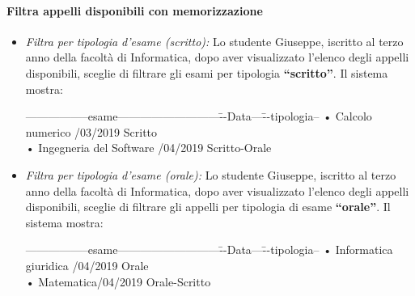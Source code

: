 \paragraph{Filtra appelli disponibili con memorizzazione}
\begin{itemize}
	\item \textit{Filtra per tipologia d’esame (scritto):}
	Lo studente Giuseppe, iscritto al terzo anno della facoltà di Informatica, dopo aver visualizzato l’elenco degli appelli disponibili, sceglie di filtrare gli esami per tipologia \textbf{“scritto”}. Il sistema mostra:  
	\begin{tabbing}
		\hspace{1cm}-----------------esame---------------------------\=--Data---\= --tipologia--\kill
		\hspace{1cm} • Calcolo numerico  /03/2019 \> \hspace{1cm}Scritto \\
		\hspace{1cm} • Ingegneria del Software /04/2019 \> \hspace{1cm}Scritto-Orale  \\
	\end{tabbing}
	
	\item \textit{Filtra per tipologia d’esame (orale):}
	Lo studente Giuseppe, iscritto al terzo anno della facoltà di Informatica, dopo aver visualizzato l’elenco degli appelli disponibili, sceglie di filtrare gli appelli per tipologia di esame \textbf{“orale”}. Il sistema mostra:
	\begin{tabbing}
		\hspace{1cm}-----------------esame---------------------------\=--Data---\= --tipologia--\kill
		\hspace{1cm} • Informatica giuridica  /04/2019\> \hspace{1cm}Orale \\
		\hspace{1cm} • Matematica/04/2019 \> \hspace{1cm}Orale-Scritto  \\
	\end{tabbing}
	

\end{itemize}
